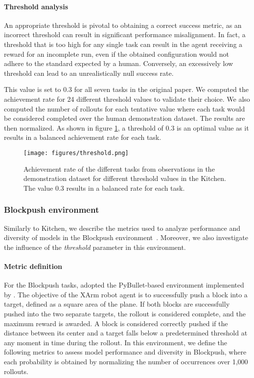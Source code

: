 \paragraph{Threshold analysis}

An appropriate threshold is pivotal to obtaining a correct success metric, as an incorrect threshold can result in significant performance misalignment. In fact, a threshold that is too high for any single task can result in the agent receiving a reward for an incomplete run, even if the obtained configuration would not adhere to the standard expected by a human. Conversely, an excessively low threshold can lead to an unrealistically null success rate.

This value is set to 0.3 for all seven tasks in the original paper.
We computed the achievement rate for 24 different threshold values to validate their choice.
We also computed the number of rollouts for each tentative value where each task would be considered completed over the human demonstration dataset.
The results are then normalized.
As shown in figure \ref{fig:kitchen_threshold}, a threshold of 0.3 is an optimal value as it results in a balanced achievement rate for each task.

\begin{figure}[H]
\texttt{[image: figures/threshold.png]}
\centering
\caption{Achievement rate of the different tasks from observations in the demonstration dataset for different threshold values in the Kitchen.
The value 0.3 results in a balanced rate for each task.}
\label{fig:kitchen_threshold}
\end{figure}

\subsubsection{Blockpush environment}

Similarly to Kitchen, we describe the metrics used to analyze performance and diversity of models in the Blockpush environment~\cite{florence_implicit_2021}. 
Moreover, we also investigate the influence of the \textit{threshold} parameter in this environment.

\paragraph{Metric definition}

For the Blockpush tasks, \citet{shafiullah2022behavior} adopted the PyBullet-based environment implemented by \citet{florence_implicit_2021}. 
The objective of the XArm robot agent is to successfully push a block into a target, defined as a square area of the plane.
If both blocks are successfully pushed into the two separate targets, the rollout is considered complete, and the maximum reward is awarded.
A block is considered correctly pushed if the distance between its center and a target falls below a predetermined threshold at any moment in time during the rollout.
In this environment, we define the following metrics to assess model performance and diversity in Blockpush, where each probability is obtained by normalizing the number of occurrences over 1,000 rollouts.

